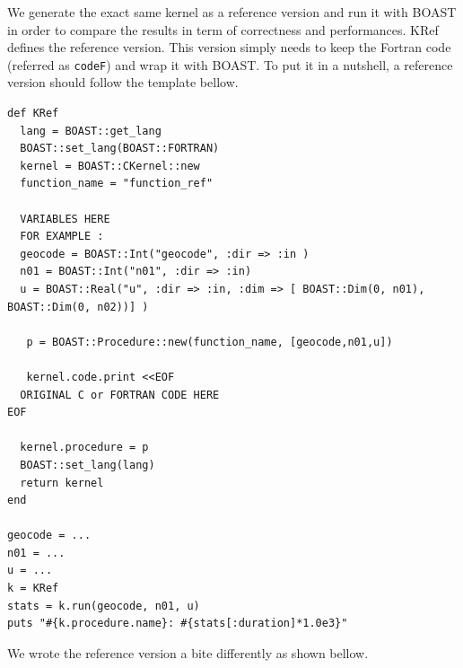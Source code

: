 \documentclass[10pt,twoside]{article}   	%
\begin{document}
We generate the exact same kernel as a reference version and run it with BOAST in order to compare the results in term of correctness and performances. KRef defines the reference version. This version simply needs to keep the Fortran code (referred as \texttt{codeF}) and wrap it with BOAST. To put it in a nutshell, a reference version should follow the template bellow.

\lstset{language=RUBY}
\begin{lstlisting}[caption=KRef\_template.rb]
def KRef
  lang = BOAST::get_lang
  BOAST::set_lang(BOAST::FORTRAN)
  kernel = BOAST::CKernel::new
  function_name = "function_ref"

  VARIABLES HERE
  FOR EXAMPLE : 
  geocode = BOAST::Int("geocode", :dir => :in )
  n01 = BOAST::Int("n01", :dir => :in)
  u = BOAST::Real("u", :dir => :in, :dim => [ BOAST::Dim(0, n01),  BOAST::Dim(0, n02))] )

   p = BOAST::Procedure::new(function_name, [geocode,n01,u])

   kernel.code.print <<EOF
  ORIGINAL C or FORTRAN CODE HERE
EOF

  kernel.procedure = p
  BOAST::set_lang(lang)
  return kernel
end

geocode = ...
n01 = ...
u = ...
k = KRef
stats = k.run(geocode, n01, u)
puts "#{k.procedure.name}: #{stats[:duration]*1.0e3}"
\end{lstlisting}



We wrote the reference version a bite differently as shown bellow.
\end{document}
